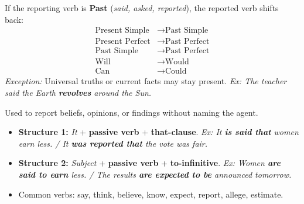 \documentclass[11pt]{article}
\newcommand{\cle}[1]{{\popxbold\color{popdark}#1}}
\begin{document}
\begin{bilan}
\begin{propriete}
If the reporting verb is \textbf{Past} (\emph{said, asked, reported}), the reported verb shifts back:
\begin{align*}
\text{Present Simple} &\to \text{Past Simple} \\
\text{Present Perfect} &\to \text{Past Perfect} \\
\text{Past Simple} &\to \text{Past Perfect} \\
\text{Will} &\to \text{Would} \\
\text{Can} &\to \text{Could}
\end{align*}
\emph{Exception:} Universal truths or current facts may stay present. \emph{Ex: The teacher said the Earth \textbf{revolves} around the Sun.}
\end{propriete}

\begin{propriete}
Used to report beliefs, opinions, or findings without naming the agent.
\begin{itemize}
  \item \textbf{Structure 1:} \emph{It} + \textbf{passive verb} + \textbf{that-clause}.
  \emph{Ex: It \textbf{is said that} women earn less. / It \textbf{was reported that} the vote was fair.}
  \item \textbf{Structure 2:} \emph{Subject} + \textbf{passive verb} + \textbf{to-infinitive}.
  \emph{Ex: Women \textbf{are said to earn} less. / The results \textbf{are expected to be} announced tomorrow.}
  \item Common verbs: \cle{say, think, believe, know, expect, report, allege, estimate}.
\end{itemize}
\end{propriete}


\end{bilan}
\end{document}
